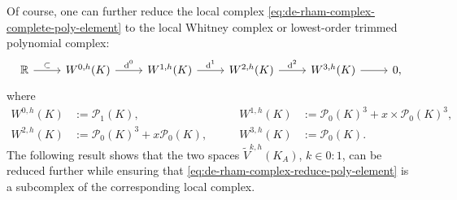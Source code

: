 \documentclass{mcom-l}
\theoremstyle{definition}
\theoremstyle{remark}
\numberwithin{equation}{section}
\DeclareMathOperator{\dee}{d}
\begin{document}
Of course, one can further reduce the local complex 
\cref{eq:de-rham-complex-complete-poly-element} to 
the local Whitney complex or lowest-order trimmed polynomial complex:
\begin{equation}
	\label{eq:de-rham-complex-reduce-poly-element}
	\begin{tikzcd}
		\mathbb{R} \arrow[r, "\subset"] 
		& W^{0, h}(K) \arrow[r, "\dee^0"] 
		& W^{1, h}(K) \arrow[r, "\dee^1"] 
		& W^{2, h}(K) \arrow[r, "\dee^2"]
		& W^{3, h}(K) \arrow[r]
		& 0,
	\end{tikzcd}
\end{equation}
where
\begin{subequations}
	\label{eq:whitney-forms-local}
	\begin{alignat}{2}
		W^{0, h}(K) &:= \mathcal{P}_1(K), \qquad &
		W^{1, h}(K) &:= \mathcal{P}_{0}(K)^3 + x \times \mathcal{P}_0(K)^3, \\
		W^{2, h}(K) &:= \mathcal{P}_{0}(K)^3 + x \mathcal{P}_0(K), \qquad &
		W^{3, h}(K) &:= \mathcal{P}_0(K).
	\end{alignat}
\end{subequations}
The following result shows that the two spaces $\tilde{V}^{k, h}(K_A)$, 
$k \in 0:1$, can be reduced further while ensuring that 
\cref{eq:de-rham-complex-reduce-poly-element} is a subcomplex of the 
corresponding local complex.
\end{document}
